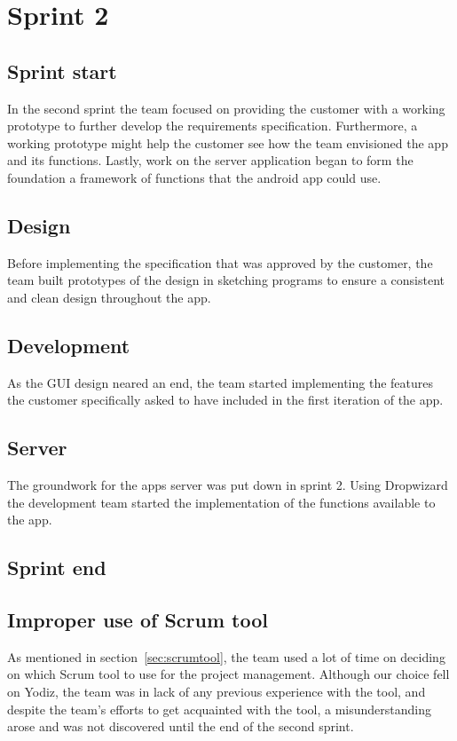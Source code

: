 \section{Sprint 2}

\subsection{Sprint start}
In the second sprint the team focused on providing the customer with a working
prototype to further develop the requirements specification. Furthermore, a
working prototype might help the customer see how the team envisioned the app
and its functions. Lastly, work on the server application began to form the
foundation a framework of functions that the android app could use.

\subsection{Design}
Before implementing the specification that was approved by the customer, the
team built prototypes of the design in sketching programs to ensure a consistent
and clean design throughout the app. 

\subsection{Development}
As the GUI design neared an end, the team started implementing the features the
customer specifically asked to have included in the first iteration of the app.

\subsection{Server}
The groundwork for the apps server was put down in sprint 2. Using Dropwizard
the development team started the implementation of the functions available to
the app.





\subsection{Sprint end}

\subsection{Improper use of Scrum tool}
\label{sec:improperScrum}
As mentioned in section~\ref{sec:scrumtool}, the team used a lot of time on
deciding on which Scrum tool to use for the project management. Although our
choice fell on Yodiz, the team was in lack of any previous experience with the
tool, and despite the team's efforts to get acquainted with the tool, a
misunderstanding arose and was not discovered until the end of the second
sprint.

